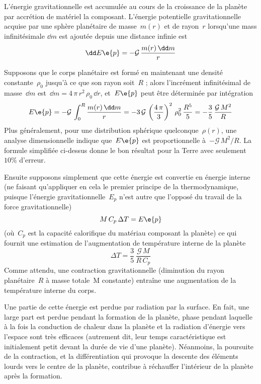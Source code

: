 \sk
L'énergie gravitationnelle est accumulée au cours de la croissance de la planète
par accrétion de matériel la composant.
L'énergie potentielle gravitationnelle acquise par une sphère planétaire
de masse~$m(r)$ et de rayon~$r$ lorsqu'une mass infinitésimale $\dd m$
est ajoutée depuis une distance infinie
est
\[ \dd E\e{p} = - \mathcal{G} \, \frac{m(r) \, \dd m}{r}  \]

\sk
Supposons que le corps planétaire est formé en maintenant une densité constante~$\rho_0$
jusqu'à ce que son rayon soit~$R$ ; alors l'incrément infinitésimal de masse~$\dd m$
est~$\dd m = 4 \, \pi \, r^2 \, \rho_0 \, \dd r$, et~$E\e{p}$ peut être déterminée par
intégration
\[ E\e{p} = - \mathcal{G} \, \int_{0}^{R} \frac{m(r) \, \dd m}{r}  
= - 3 \, \mathcal{G} \, \left( \frac{4\,\pi}{3} \right)^2 \, \rho_0^2 \, \frac{R^5}{5}
= - \frac{3}{5} \, \frac{\mathcal{G}\,M^2}{R} \] 
\noindent Plus généralement, pour une distribution sphérique quelconque~$\rho(r)$,
une analyse dimensionnelle indique que~$E\e{p}$ est proportionnelle à~$-\mathcal{G}\,M^2/R$.
La formule simplifiée ci-dessus donne le bon résultat pour la Terre avec seulement~$10\%$ d'erreur.

\sk
Ensuite supposons simplement que cette énergie est convertie en énergie interne
(ne faisant qu'appliquer en cela le premier principe de la thermodynamique, puisque
l'énergie gravitationnelle~$E_p$ n'est autre que l'opposé du travail de la force gravitationnelle)
\[ M \, C_p \, \Delta T = E\e{p} \]
\noindent (où~$C_p$ est la capacité calorifique du matériau composant la planète)
ce qui fournit une estimation de l'augmentation de température interne de la planète
\[ \Delta T = \frac{3}{5} \, \frac{\mathcal{G}\,M}{R\,C_p} \]
\noindent Comme attendu, une contraction gravitationnelle 
(diminution du rayon planétaire~$R$ à masse totale~M constante)
entraîne une augmentation de la température interne du corps.

\sk
Une partie de cette énergie est perdue par radiation par la surface.
En fait, une large part est perdue pendant la formation de la planète,
phase pendant laquelle à la fois 
la conduction de chaleur dans la planète
et la radiation d'énergie vers l'espace
sont très efficaces (autrement dit, leur temps caractéristique
est initialement petit devant la durée de vie d'une planète).
Néanmoins, la poursuite de la contraction,
et la différentiation qui provoque la descente
des éléments lourds vers le centre de la planète,
contribue à réchauffer l'intérieur de la planète
après la formation.

